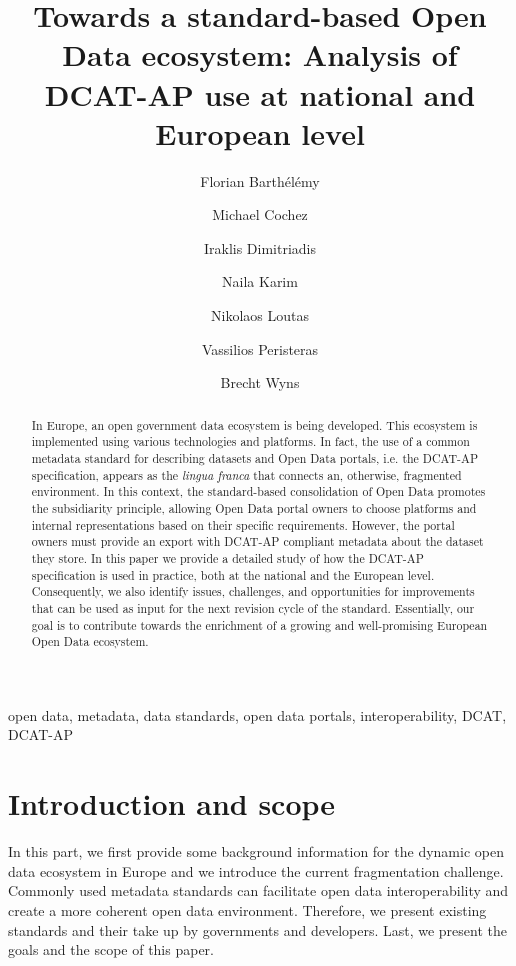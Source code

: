 \documentclass[<options>]{elsarticle}
\begin{document}
\begin{frontmatter}

\title{Towards a standard-based Open Data ecosystem: Analysis of DCAT-AP use at national and European level}

\author[1]{Florian Barth\'el\'emy}
\author[2]{Michael Cochez}
\author[2]{Iraklis Dimitriadis}
\author[2]{Naila Karim}
\author[1]{Nikolaos Loutas}
\author[3]{Vassilios Peristeras}
\author[1]{Brecht Wyns}

\address[1]{PwC Belgium}
\address[2]{Fraunhofer/FIT, Germany}
\address[3]{International Hellenic University, Greece}

\begin{abstract}
In Europe, an open government data ecosystem is being developed. This ecosystem is implemented using various technologies and platforms. In fact, the use of a common metadata standard for describing datasets and Open Data portals, i.e. the DCAT-AP specification, appears as the \textit{lingua franca} that connects an, otherwise, fragmented environment. In this context, the standard-based consolidation of Open Data promotes the subsidiarity principle, allowing Open Data portal owners to choose platforms and internal representations based on their specific requirements. However, the portal owners must provide an export with DCAT-AP compliant metadata about the dataset they store. In this paper we provide a detailed study of how the DCAT-AP specification is used in practice, both at the national and the European level. Consequently, we also identify issues, challenges, and opportunities for improvements that can be used as input for the next revision cycle of the standard. Essentially, our goal is to contribute towards the enrichment of a growing and well-promising European Open Data ecosystem.
\end{abstract}

\begin{keyword}
open data, metadata, data standards, open data portals, interoperability, DCAT, DCAT-AP
\end{keyword}

\end{frontmatter}

\linenumbers

\section{Introduction and scope}
In this part, we first provide some background information for the dynamic open data ecosystem in Europe and we introduce the current fragmentation challenge. Commonly used metadata standards can facilitate open data interoperability and create a more coherent open data environment. Therefore, we present existing standards and their take up by governments and developers. Last, we present the goals and the scope of this paper. 
\end{document}

